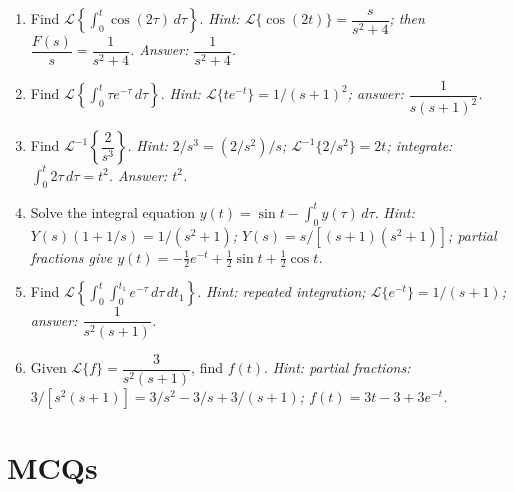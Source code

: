 \documentclass[12pt,a4paper]{article}
\begin{document}
\begin{enumerate}[label=\textbf{P\arabic*.}, leftmargin=*, itemsep=8pt]

\item Find $\mathcal{L}\!\left\{\displaystyle\int_0^t \cos(2\tau)\,d\tau\right\}$.
  \hfill\textit{Hint: $\mathcal{L}\{\cos(2t)\} = \dfrac{s}{s^2+4}$; then $\dfrac{F(s)}{s} = \dfrac{1}{s^2+4}$. Answer: $\dfrac{1}{s^2+4}$.}

\item Find $\mathcal{L}\!\left\{\displaystyle\int_0^t \tau e^{-\tau}\,d\tau\right\}$.
  \hfill\textit{Hint: $\mathcal{L}\{te^{-t}\} = 1/(s+1)^2$; answer: $\dfrac{1}{s(s+1)^2}$.}

\item Find $\mathcal{L}^{-1}\!\left\{\dfrac{2}{s^3}\right\}$.
  \hfill\textit{Hint: $2/s^3 = (2/s^2)/s$; $\mathcal{L}^{-1}\{2/s^2\} = 2t$;
  integrate: $\int_0^t 2\tau\,d\tau = t^2$. Answer: $t^2$.}

\item Solve the integral equation $y(t) = \sin t - \displaystyle\int_0^t y(\tau)\,d\tau$.
  \hfill\textit{Hint: $Y(s)(1+1/s) = 1/(s^2+1)$; $Y(s) = s/[(s+1)(s^2+1)]$;
  partial fractions give $y(t) = -\tfrac{1}{2}e^{-t} + \tfrac{1}{2}\sin t + \tfrac{1}{2}\cos t$.}

\item Find $\mathcal{L}\!\left\{\displaystyle\int_0^t\!\int_0^{t_1} e^{-\tau}\,d\tau\,dt_1\right\}$.
  \hfill\textit{Hint: repeated integration; $\mathcal{L}\{e^{-t}\} = 1/(s+1)$;
  answer: $\dfrac{1}{s^2(s+1)}$.}

\item Given $\mathcal{L}\{f\} = \dfrac{3}{s^2(s+1)}$, find $f(t)$.
  \hfill\textit{Hint: partial fractions: $3/[s^2(s+1)] = 3/s^2 - 3/s + 3/(s+1)$;
  $f(t) = 3t - 3 + 3e^{-t}$.}

\end{enumerate}

\section{MCQs}
\end{document}
